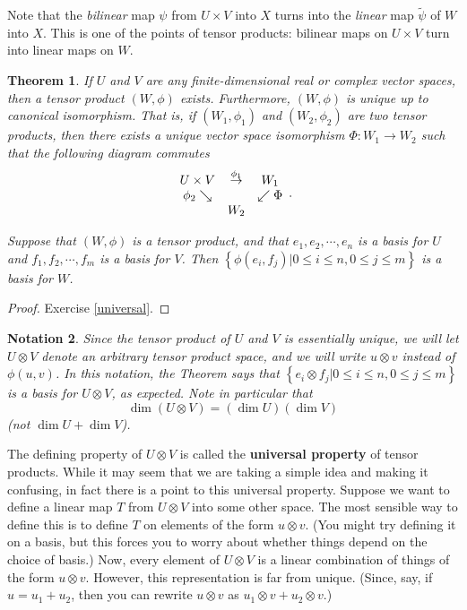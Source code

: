 \documentclass[12pt]{amsbook}
\theoremstyle{plain}
\newtheorem{theorem}{Theorem}
\newtheorem{notation}[theorem]{Notation}
\numberwithin{equation}{chapter}
\numberwithin{theorem}{chapter}
\begin{document}
Note that the \textit{bilinear} map $\psi$ from $U\times V$ into $X$ turns
into the \textit{linear} map $\widetilde{\psi}$ of $W$ into $X$. This is one
of the points of tensor products: bilinear maps on $U\times V$ turn into
linear maps on $W$.

\begin{theorem}
\label{tensor.exist}If $U$ and $V$ are any finite-dimensional real or complex
vector spaces, then a tensor product $(W,\phi)$ exists. Furthermore,
$(W,\phi)$ is unique up to canonical isomorphism. That is, if $(W_{1},\phi
_{1})$ and $(W_{2},\phi_{2})$ are two tensor products, then there exists a
unique vector space isomorphism $\Phi:W_{1}\rightarrow W_{2}$ such that the
following diagram commutes
\[%
\begin{array}
[c]{ccc}%
U\times V & \overset{\phi_{1}}{\rightarrow} & W_{1}\\
\phi_{2}\searrow &  & \swarrow\Phi\\
&  W_{2} &
\end{array}
\text{.}%
\]

Suppose that $(W,\phi)$ is a tensor product, and that $e_{1},e_{2}%
,\cdots,e_{n}$ is a basis for $U$ and $f_{1},f_{2},\cdots,f_{m}$ is a basis
for $V$. Then $\left\{  \phi(e_{i},f_{j})\left|  0\leq i\leq n,0\leq j\leq
m\right.  \right\}  $ is a basis for $W$.
\end{theorem}

\begin{proof}
Exercise \ref{universal}.
\end{proof}

\begin{notation}
Since the tensor product of $U$ and $V$ is essentially unique, we will let
$U\otimes V$ denote an arbitrary tensor product space, and we will write
$u\otimes v$ instead of $\phi(u,v)$. In this notation, the Theorem says that
$\left\{  e_{i}\otimes f_{j}\left|  0\leq i\leq n,0\leq j\leq m\right.
\right\}  $ is a basis for $U\otimes V$, as expected. Note in particular that
\[
\dim\left(  U\otimes V\right)  =\left(  \dim U\right)  \left(  \dim V\right)
\]
(not $\dim U+\dim V$).
\end{notation}

The defining property of $U\otimes V$ is called the \textbf{universal
property} of tensor products. While it may seem that we are taking a simple
idea and making it confusing, in fact there is a point to this universal
property. Suppose we want to define a linear map $T$ from $U\otimes V$ into
some other space. The most sensible way to define this is to define $T$ on
elements of the form $u\otimes v$. (You might try defining it on a basis, but
this forces you to worry about whether things depend on the choice of basis.)
Now, every element of $U\otimes V$ is a linear combination of things of the
form $u\otimes v$. However, this representation is far from unique. (Since,
say, if $u=u_{1}+u_{2}$, then you can rewrite $u\otimes v$ as $u_{1}\otimes
v+u_{2}\otimes v$.)
\end{document}
